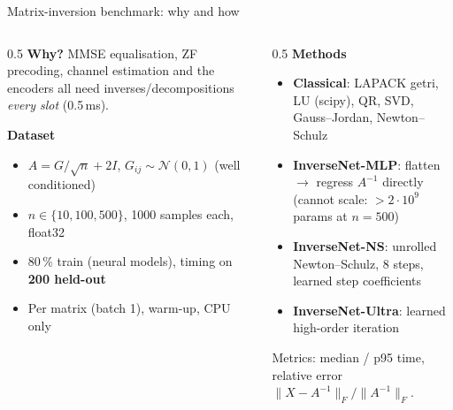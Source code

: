 \documentclass[aspectratio=169,11pt,xcolor=table]{beamer}
\begin{document}
\begin{frame}{Matrix-inversion benchmark: why and how}
  \begin{columns}[T]
    \begin{column}{0.5\textwidth}
      \textbf{Why?} MMSE equalisation, ZF precoding, channel estimation and the encoders all need inverses/decompositions \emph{every slot} (0.5\,ms).
      \vspace{0.5em}

      \textbf{Dataset}
      \begin{itemize}
        \item $A = G/\sqrt{n} + 2I$, $G_{ij}\sim\mathcal N(0,1)$ (well conditioned)
        \item $n \in \{10, 100, 500\}$, 1000 samples each, float32
        \item 80\,\% train (neural models), timing on \textbf{200 held-out}
        \item Per matrix (batch 1), warm-up, CPU only
      \end{itemize}
    \end{column}
    \begin{column}{0.5\textwidth}
      \textbf{Methods}
      \begin{itemize}
        \item \textbf{Classical}: LAPACK getri, LU (scipy), QR, SVD, Gauss--Jordan, Newton--Schulz
        \item \textbf{InverseNet-MLP}: flatten $\to$ regress $A^{-1}$ directly (cannot scale: $>2\cdot10^9$ params at $n=500$)
        \item \textbf{InverseNet-NS}: unrolled Newton--Schulz, 8 steps, learned step coefficients
        \item \textbf{InverseNet-Ultra}: learned high-order iteration
      \end{itemize}
      Metrics: median / p95 time, relative error $\|X - A^{-1}\|_F / \|A^{-1}\|_F$.
    \end{column}
  \end{columns}
\end{frame}
\end{document}
